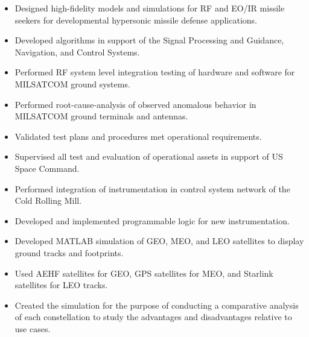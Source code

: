 \documentclass[10pt,a4paper]{altacv}
\begin{document}
\begin{itemize}
\item Designed high-fidelity models and simulations for RF and EO/IR missile seekers for developmental hypersonic missile defense applications.
\item Developed algorithms in support of the Signal Processing and Guidance, Navigation, and Control Systems.
\end{itemize}
\medskip

\begin{itemize}
\item Performed RF system level integration testing of hardware and software for MILSATCOM ground systems.
\item Performed root-cause-analysis of observed anomalous behavior in MILSATCOM ground terminals and antennas.
\end{itemize}
\medskip

\begin{itemize}
\item Validated test plans and procedures met operational requirements.
\item Supervised all test and evaluation of operational assets in support of US Space Command.
\end{itemize}
\medskip

\begin{itemize}
\item Performed integration of instrumentation in control system network of the Cold Rolling Mill.
\item Developed and implemented programmable logic for new instrumentation.
\end{itemize}
\newpage


\begin{itemize}
    \item Developed MATLAB simulation of GEO, MEO, and LEO satellites to display ground tracks and footprints.
    \item Used AEHF satellites for GEO, GPS satellites for MEO, and Starlink satellites for LEO tracks.
    \item Created the simulation for the purpose of conducting a comparative analysis of each constellation to study the advantages and disadvantages relative to use cases.
\end{itemize}
\medskip
\divider
\end{document}
